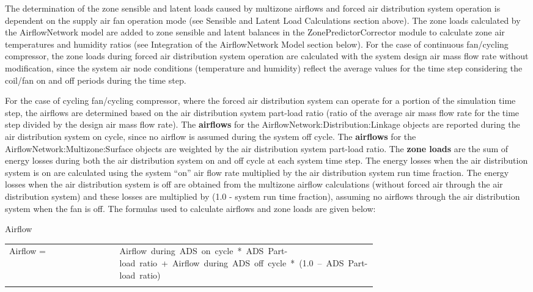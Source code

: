 The determination of the zone sensible and latent loads caused by multizone airflows and forced air distribution system operation is dependent on the supply air fan operation mode (see Sensible and Latent Load Calculations section above). The zone loads calculated by the AirflowNetwork model are added to zone sensible and latent balances in the ZonePredictorCorrector module to calculate zone air temperatures and humidity ratios (see Integration of the AirflowNetwork Model section below). For the case of continuous fan/cycling compressor, the zone loads during forced air distribution system operation are calculated with the system design air mass flow rate without modification, since the system air node conditions (temperature and humidity) reflect the average values for the time step considering the coil/fan on and off periods during the time step.

For the case of cycling fan/cycling compressor, where the forced air distribution system can operate for a portion of the simulation time step, the airflows are determined based on the air distribution system part-load ratio (ratio of the average air mass flow rate for the time step divided by the design air mass flow rate). The \textbf{airflows} for the AirflowNetwork:Distribution:Linkage objects are reported during the air distribution system on cycle, since no airflow is assumed during the system off cycle. The \textbf{airflows} for the AirflowNetwork:Multizone:Surface objects are weighted by the air distribution system part-load ratio. The \textbf{zone loads} are the sum of energy losses during both the air distribution system on and off cycle at each system time step. The energy losses when the air distribution system is on are calculated using the system ``on'' air flow rate multiplied by the air distribution system run time fraction. The energy losses when the air distribution system is off are obtained from the multizone airflow calculations (without forced air through the air distribution system) and these losses are multiplied by (1.0 - system run time fraction), assuming no airflows through the air distribution system when the fan is off. The formulas used to calculate airflows and zone loads are given below:

Airflow

\begin{tabular}{lp{0.7\linewidth}}
\\
Airflow = &Airflow~during~ADS~on~cycle~*~ADS~Part-load~ratio~+~Airflow~during~ADS~off~cycle~*~(1.0~--~ADS~Part-load~ratio)\\
\\
\end{tabular}


